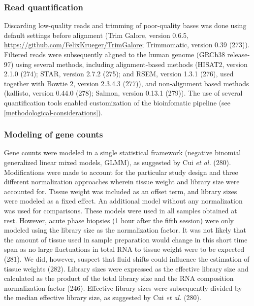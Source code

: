 \documentclass[twoside,10pt]{gihclass} %
\begin{document}
\hypertarget{read-quantification}{%
\subsubsection{Read quantification}\label{read-quantification}}

Discarding low-quality reads and trimming of poor-quality bases was done using default settings before alignment (Trim Galore, version 0.6.5, \url{https://github.com/FelixKrueger/TrimGalore}; Trimmomatic, version 0.39 (273)). Filtered reads were subsequently aligned to the human genome (GRCh38 release-97) using several methods, including alignment-based methods
(HISAT2, version 2.1.0 (274); STAR, version 2.7.2 (275); and
RSEM, version 1.3.1 (276),
used together with Bowtie 2, version 2.3.4.3 (277)),
and non-alignment based methods (kallisto, version 0.44.0 (278);
Salmon, version 0.13.1 (279)).
The use of several quantification tools enabled customization of the bioinfomatic pipeline (see \ref{methodological-considerations}).

\hypertarget{modeling-of-gene-counts}{%
\subsubsection{Modeling of gene counts}\label{modeling-of-gene-counts}}

Gene counts were modeled in a single statistical framework (negative binomial generalized linear mixed models, GLMM), as suggested by Cui \emph{et al.} (280).
Modifications were made to account for the particular study design and three different normalization approaches wherein tissue weight and library size were accounted for. Tissue weight was included as an offset term, and library sizes were modeled as a fixed effect.
An additional model without any normalization was used for comparisons.
These models were used in all samples obtained at rest. However, acute phase biopsies (1 hour after the fifth session) were only modeled using the library size as the normalization factor. It was not likely that the amount of tissue used in sample preparation would change in this short time span as no large fluctuations in total RNA to tissue weight were to be expected
(281).
We did, however, suspect that fluid shifts could influence the estimation of tissue weights
(282).
Library sizes were expressed as the effective library size and calculated as the product of the total library size and the RNA composition normalization factor
(246).
Effective library sizes were subsequently divided by the median effective library size, as suggested by Cui \emph{et al.}
(280).
\end{document}
